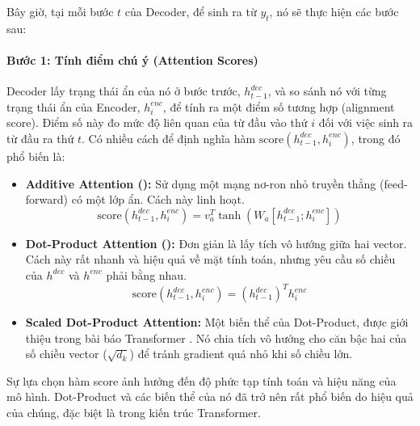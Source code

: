 Bây giờ, tại mỗi bước $t$ của Decoder, để sinh ra từ $y_t$, nó sẽ thực hiện các bước sau:

\begin{center}
    \label{fig:seq2seq_attention_mechanism}
\end{center}

\paragraph{Bước 1: Tính điểm chú ý (Attention Scores)}
Decoder lấy trạng thái ẩn của nó ở bước trước, $h_{t-1}^{dec}$, và so sánh nó với từng trạng thái ẩn của Encoder, $h_i^{enc}$, để tính ra một điểm số tương hợp (alignment score). Điểm số này đo mức độ liên quan của từ đầu vào thứ $i$ đối với việc sinh ra từ đầu ra thứ $t$. Có nhiều cách để định nghĩa hàm $\text{score}(h_{t-1}^{dec}, h_i^{enc})$, trong đó phổ biến là:
\begin{itemize}
    \item \textbf{Additive Attention (\cite{bahdanau2014neural}):} Sử dụng một mạng nơ-ron nhỏ truyền thẳng (feed-forward) có một lớp ẩn. Cách này linh hoạt.
        $$ \text{score}(h_{t-1}^{dec}, h_i^{enc}) = v_a^T \tanh(W_a [h_{t-1}^{dec}; h_i^{enc}]) $$
    \item \textbf{Dot-Product Attention (\cite{luong2015effective}):} Đơn giản là lấy tích vô hướng giữa hai vector. Cách này rất nhanh và hiệu quả về mặt tính toán, nhưng yêu cầu số chiều của $h^{dec}$ và $h^{enc}$ phải bằng nhau.
        $$ \text{score}(h_{t-1}^{dec}, h_i^{enc}) = (h_{t-1}^{dec})^T h_i^{enc} $$
    \item \textbf{Scaled Dot-Product Attention:} Một biến thể của Dot-Product, được giới thiệu trong bài báo Transformer \cite{vaswani2017attention}. Nó chia tích vô hướng cho căn bậc hai của số chiều vector ($\sqrt{d_k}$) để tránh gradient quá nhỏ khi số chiều lớn.
\end{itemize}
Sự lựa chọn hàm score ảnh hưởng đến độ phức tạp tính toán và hiệu năng của mô hình. Dot-Product và các biến thể của nó đã trở nên rất phổ biến do hiệu quả của chúng, đặc biệt là trong kiến trúc Transformer.
